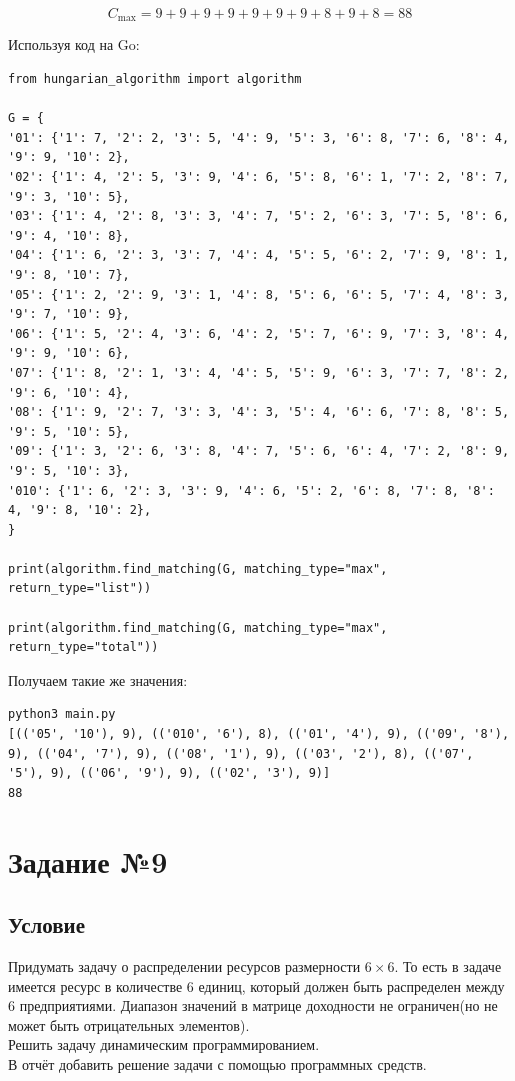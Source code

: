 \documentclass{article}
\begin{document}
\[ C_{\text{max}} = 9 + 9 + 9 + 9 + 9 + 9 + 9 + 8 + 9 + 8 = 88 \]

Используя код на Go:

\begin{verbatim}
from hungarian_algorithm import algorithm

G = {
'01': {'1': 7, '2': 2, '3': 5, '4': 9, '5': 3, '6': 8, '7': 6, '8': 4, '9': 9, '10': 2},
'02': {'1': 4, '2': 5, '3': 9, '4': 6, '5': 8, '6': 1, '7': 2, '8': 7, '9': 3, '10': 5},
'03': {'1': 4, '2': 8, '3': 3, '4': 7, '5': 2, '6': 3, '7': 5, '8': 6, '9': 4, '10': 8},
'04': {'1': 6, '2': 3, '3': 7, '4': 4, '5': 5, '6': 2, '7': 9, '8': 1, '9': 8, '10': 7},
'05': {'1': 2, '2': 9, '3': 1, '4': 8, '5': 6, '6': 5, '7': 4, '8': 3, '9': 7, '10': 9},
'06': {'1': 5, '2': 4, '3': 6, '4': 2, '5': 7, '6': 9, '7': 3, '8': 4, '9': 9, '10': 6},
'07': {'1': 8, '2': 1, '3': 4, '4': 5, '5': 9, '6': 3, '7': 7, '8': 2, '9': 6, '10': 4},
'08': {'1': 9, '2': 7, '3': 3, '4': 3, '5': 4, '6': 6, '7': 8, '8': 5, '9': 5, '10': 5},
'09': {'1': 3, '2': 6, '3': 8, '4': 7, '5': 6, '6': 4, '7': 2, '8': 9, '9': 5, '10': 3},
'010': {'1': 6, '2': 3, '3': 9, '4': 6, '5': 2, '6': 8, '7': 8, '8': 4, '9': 8, '10': 2},
}

print(algorithm.find_matching(G, matching_type="max", return_type="list"))

print(algorithm.find_matching(G, matching_type="max", return_type="total"))
\end{verbatim}

Получаем такие же значения:
\begin{verbatim}
python3 main.py
[(('05', '10'), 9), (('010', '6'), 8), (('01', '4'), 9), (('09', '8'), 9), (('04', '7'), 9), (('08', '1'), 9), (('03', '2'), 8), (('07', '5'), 9), (('06', '9'), 9), (('02', '3'), 9)]
88
\end{verbatim}

\section{Задание №9}

\subsection{Условие}

Придумать задачу о распределении ресурсов размерности $6 \times 6$.
То есть в задаче имеется ресурс в количестве 6 единиц, который должен быть распределен между 6 предприятиями.
Диапазон значений в матрице доходности не ограничен(но не может быть отрицательных элементов).\\
Решить задачу динамическим программированием.\\
В отчёт добавить решение задачи с помощью программных средств.
\end{document}

